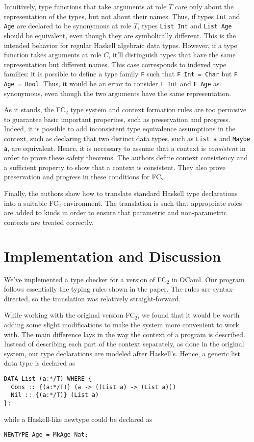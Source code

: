 \documentclass{article}
\newcommand{\fct}{FC\(_2\)\xspace}
\newcommand{\kindc}{\(C\)\xspace}
\newcommand{\kindt}{\(T\)\xspace}
\begin{document}
Intuitively, type functions that take arguments at role \kindt care
only about the representation of the types, but not about their
names. Thus, if types \texttt{Int} and \texttt{Age} are declared to be
synonymous at role \kindt, types \texttt{List Int} and \texttt{List
  Age} should be equivalent, even though they are symbolically
different. This is the intended behavior for regular Haskell algebraic
data types. However, if a type function takes arguments at role
\kindc, it'll distinguish types that have the same representation but
different names. This case corresponds to indexed type families: it is
possible to define a type family \texttt{F} such that \texttt{F Int =
  Char} but \texttt{F Age = Bool}. Thus, it would be an error to
consider \texttt{F Int} and \texttt{F Age} as synonymous, even though
the two arguments have the same representation.

As it stands, the \fct type system and context formation rules are too
permisive to guarantee basic important properties, such as
preservation and progress. Indeed, it is possible to add inconsistent
type equivalence assumptions in the context, such as declaring that
two distinct data types, such as \texttt{List a} and \texttt{Maybe a},
are equivalent. Hence, it is necessary to assume that a context is
\emph{consistent} in order to prove these safety theorems. The authors
define context consistency and a sufficient property to show that a
context is consistent. They also prove preservation and progress in
these conditions for \fct.

Finally, the authors show how to translate standard Haskell type
declarations into a suitable \fct environment. The translation is such
that appropriate roles are added to kinds in order to ensure that
parametric and non-parametric contexts are treated correctly.

\section{Implementation and Discussion}

\label{sec:implementation}

We've implemented a type checker for a version of \fct in OCaml. Our
program follows essentially the typing rules shown in the paper. The
rules are syntax-directed, so the translation was relatively
straight-forward.

While working with the original version \fct, we found that it would
be worth adding some slight modifications to make the system more
convenient to work with. The main difference lays in the way the
context of a program is described. Instead of describing each part of
the context separately, as done in the original system, our type
declarations are modeled after Haskell's. Hence, a generic list data
type is declared as
\begin{verbatim}
DATA List (a:*/T) WHERE {
  Cons :: {(a:*/T)} (a -> ((List a) -> (List a)))
  Nil :: {(a:*/T)} (List a)
};
\end{verbatim}
while a Haskell-like newtype could be declared as
\begin{verbatim}
NEWTYPE Age = MkAge Nat;
\end{verbatim}
\end{document}
